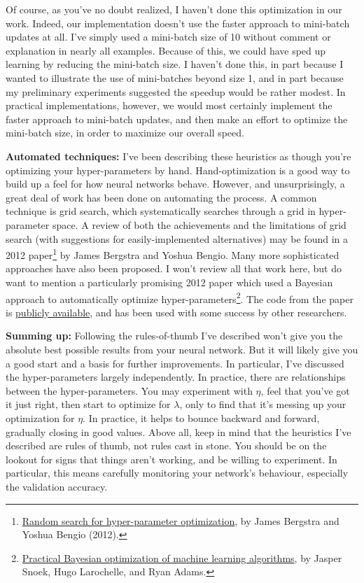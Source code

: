 \documentclass[a4paper,twoside,10pt]{book}
\begin{document}
Of course, as you've no doubt realized, I haven't done this optimization in our work. Indeed, our implementation doesn't use the faster approach to mini-batch updates at all. I've simply used a mini-batch size of 10 without comment or explanation in nearly all examples. Because of this, we could have sped up learning by reducing the mini-batch size. I haven't done this, in part because I wanted to illustrate the use of mini-batches beyond size 1, and in part because my preliminary experiments suggested the speedup would be rather modest. In practical implementations, however, we would most certainly implement the faster approach to mini-batch updates, and then make an effort to optimize the mini-batch size, in order to maximize our overall speed.

\textbf{Automated techniques:} I've been describing these heuristics as though you're optimizing your hyper-parameters by hand. Hand-optimization is a good way to build up a feel for how neural networks behave. However, and unsurprisingly, a great deal of work has been done on automating the process. A common technique is grid search, which systematically searches through a grid in hyper-parameter space. A review of both the achievements and the limitations of grid search (with suggestions for easily-implemented alternatives) may be found in a 2012 paper\footnote{\href{http://dl.acm.org/citation.cfm?id=2188395}{Random search for hyper-parameter optimization}, by James Bergstra and Yoshua Bengio (2012).} by James Bergstra and Yoshua Bengio. Many more sophisticated approaches have also been proposed. I won't review all that work here, but do want to mention a particularly promising 2012 paper which used a Bayesian approach to automatically optimize hyper-parameters\footnote{\href{http://papers.nips.cc/paper/4522-practical-bayesian-optimization-of-machine-learning-algorithms.pdf}{Practical Bayesian optimization of machine learning algorithms}, by Jasper Snoek, Hugo Larochelle, and Ryan Adams.}. The code from the paper is \href{https://github.com/jaberg/hyperopt}{publicly available}, and has been used with some success by other researchers.

\textbf{Summing up:} Following the rules-of-thumb I've described won't give you the absolute best possible results from your neural network. But it will likely give you a good start and a basis for further improvements. In particular, I've discussed the hyper-parameters largely independently. In practice, there are relationships between the hyper-parameters. You may experiment with $\eta$, feel that you've got it just right, then start to optimize for $\lambda$, only to find that it's messing up your optimization for $\eta$. In practice, it helps to bounce backward and forward, gradually closing in good values. Above all, keep in mind that the heuristics I've described are rules of thumb, not rules cast in stone. You should be on the lookout for signs that things aren't working, and be willing to experiment. In particular, this means carefully monitoring your network's behaviour, especially the validation accuracy.
\end{document}
